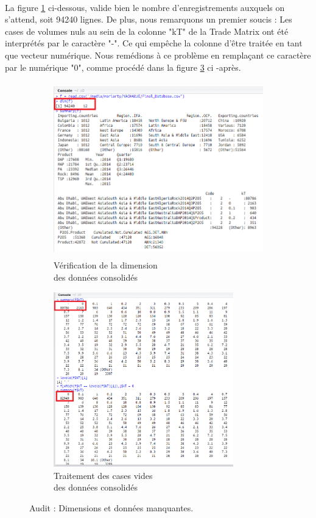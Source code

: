\paragraph{}
		La figure \ref{fig:size} ci-dessous, valide bien le nombre d'enregistrements auxquels on s'attend, soit 94240 lignes. De plus, nous remarquons un premier soucis : Les cases de volumes nuls au sein de la colonne "kT" de la Trade Matrix ont été interprétés par le caractère "-". Ce qui empêche la colonne d'être traitée en tant que vecteur numérique. Nous remédions à ce problème en remplaçant ce caractère par le numérique "0", comme procédé dans la figure \ref{fig:nas} ci -après.
		\newline
			\begin{figure}[H]
			\begin{subfigure}{.5\textwidth}
				\centering
				\includegraphics[height=215pt]{ch3-images/1}
				\caption{Vérification de la dimension\\des données consolidés}
				\label{fig:size}
			\end{subfigure}
			\begin{subfigure}{.5\textwidth}
					\centering
					\includegraphics[height=215pt]{ch3-images/2}
					\caption{Traitement des cases vides\\des données consolidés}
					\label{fig:nas}
			\end{subfigure}
			\caption{Audit : Dimensions et données manquantes.}
				\end{figure}
				
